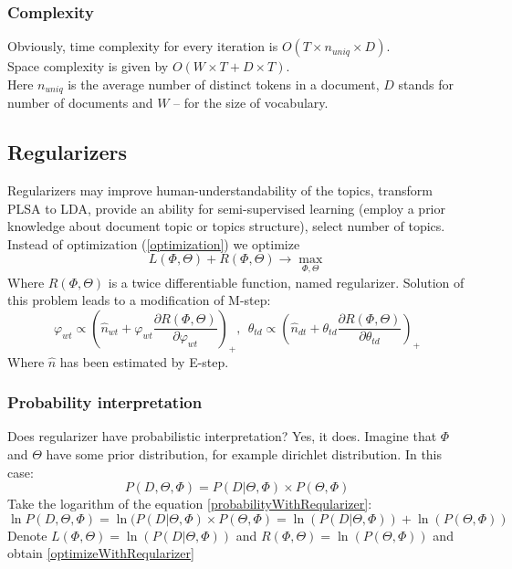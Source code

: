 	\subsubsection{Complexity}
	Obviously, time complexity for every iteration is $O(T \times n_{uniq} \times D)$.\\
	Space complexity is given by $O(W \times T + D \times T)$.\\
	Here $n_{uniq}$ is the average number of distinct tokens in a document, $D$ stands for number of documents and $W$  -- for the size of vocabulary.

    \subsection{Regularizers} \label{Regularizers}
	Regularizers may improve human-understandability of the topics, transform PLSA to LDA, provide an ability
	for semi-supervised learning (employ a prior knowledge about document topic or topics structure), select number of topics.
	Instead of optimization (\ref{optimization}) we optimize
	\begin{equation} \label{optimizeWithReqularizer} L(\Phi, \Theta) + R(\Phi, \Theta) \to \max_{\Phi, \Theta} \end{equation}
	Where $R(\Phi, \Theta)$ is a twice differentiable function, named regularizer.
	Solution of this problem leads to a modification of M\--step:
	\begin{equation}
	    \label{RegularizersEquation}
	    \varphi_{wt} \propto \left(\hat{n}_{wt} + \varphi_{wt} \frac{\partial  R(\Phi, \Theta)}{\partial \varphi_{wt}} \right)_+ ,\ \
	    \theta_{td} \propto \left(\hat{n}_{dt} + \theta_{td}\frac{\partial  R(\Phi, \Theta)}{\partial \theta_{td}} \right)_+
	\end{equation}
	Where $\hat{n}$ has been estimated by E\--step.

	\subsubsection{Probability interpretation}
	    Does regularizer have probabilistic interpretation? Yes, it does. Imagine that $\Phi$ and $\Theta$ have some prior distribution, for example
	    dirichlet distribution. In this case:
	    \begin{equation} \label{probabilityWithReqularizer} P(D, \Theta, \Phi) = P(D| \Theta, \Phi) \times P(\Theta, \Phi) \end{equation}
	    Take the logarithm of the equation \ref{probabilityWithReqularizer}:
	    \begin{equation} \ln P(D, \Theta, \Phi) = \ln(P(D| \Theta, \Phi) \times P(\Theta, \Phi) = \ln(P(D| \Theta, \Phi)) + \ln(P(\Theta, \Phi)) \end{equation}
	    Denote $L(\Phi, \Theta) = \ln(P(D| \Theta, \Phi))$ and $R(\Phi, \Theta) = \ln(P(\Theta, \Phi))$ and obtain \ref{optimizeWithReqularizer}

